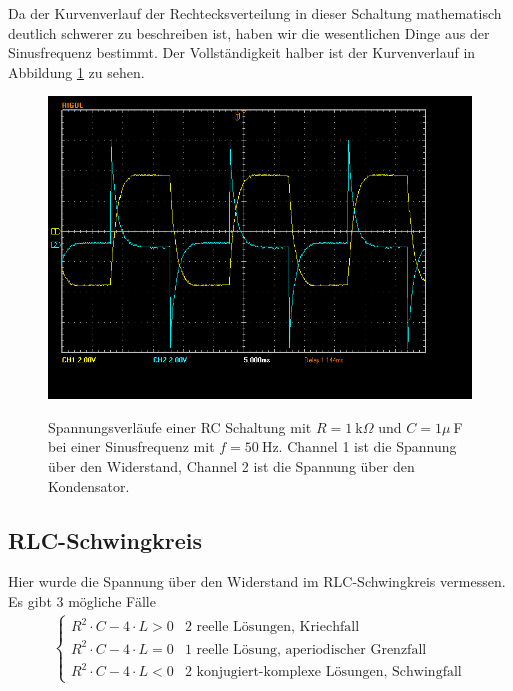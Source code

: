 \documentclass{article}
\begin{document}
Da der Kurvenverlauf der Rechtecksverteilung in dieser Schaltung mathematisch deutlich schwerer zu beschreiben ist, haben wir die wesentlichen Dinge aus der Sinusfrequenz bestimmt. Der Vollständigkeit halber ist der Kurvenverlauf in Abbildung \ref{fig:schaltung1_rechteck} zu sehen.

\begin{figure}[H]
\caption{Spannungsverläufe einer RC Schaltung mit $R=1~$k$\Omega$ und $C=1\mu~$F bei einer Sinusfrequenz mit $f=50~$Hz. Channel 1 ist die Spannung über den Widerstand, Channel 2 ist die Spannung über den Kondensator.}
\label{fig:schaltung1_rechteck}
{\centering
\includegraphics[scale=0.4]{winkler/Schaltung_1_Rechteck.png}}
\end{figure}




\subsection{RLC-Schwingkreis}


Hier wurde die Spannung über den Widerstand im RLC-Schwingkreis vermessen. Es gibt 3 mögliche Fälle
\begin{align*}
\begin{cases}
R^2\cdot C - 4\cdot L > 0 & 2 \text{ reelle Lösungen, Kriechfall} \\
R^2\cdot C - 4\cdot L = 0 & 1 \text{ reelle Lösung, aperiodischer Grenzfall} \\
R^2\cdot C - 4\cdot L < 0 & 2 \text{ konjugiert-komplexe Lösungen, Schwingfall}
\end{cases}
\end{align*}
\end{document}
